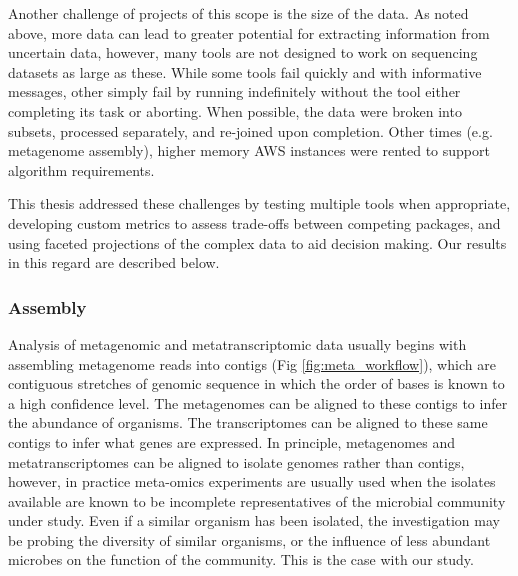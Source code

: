 Another challenge of projects of this scope is the size of the data.
As noted above, more data can lead to greater potential for extracting information from uncertain data, however, many tools are not designed to work on sequencing datasets as large as these.
While some tools fail quickly and with informative messages, other simply fail by running indefinitely without the tool either completing its task or aborting.
When possible, the data were broken into subsets, processed separately, and re-joined upon completion.
Other times (e.g. metagenome assembly), higher memory AWS instances were rented to support algorithm requirements.


This thesis addressed these challenges by testing multiple tools when appropriate, developing custom metrics to assess trade-offs between competing packages, and using faceted projections of the complex data to aid decision making.
Our results in this regard are described below.  %

\subsubsection{Assembly}   %
Analysis of metagenomic and metatranscriptomic data usually begins with assembling metagenome reads into contigs (Fig \ref{fig:meta_workflow}), which are contiguous stretches of genomic sequence in which the order of bases is known to a high confidence level. %
The metagenomes can be aligned to these contigs to infer the abundance of organisms.
The transcriptomes can be aligned to these same contigs to infer what genes are expressed.
In principle, metagenomes and metatranscriptomes can be aligned to isolate genomes rather than contigs, however, in practice meta-omics experiments are usually used when the isolates available are known to be incomplete representatives of the microbial community under study.
Even if a similar organism has been isolated, the investigation may be probing the diversity of similar organisms, or the influence of less abundant microbes on the function of the community.
This is the case with our study.

